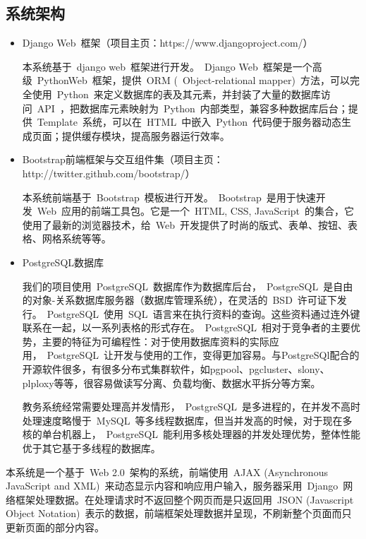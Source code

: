\subsection{系统架构}
\begin{itemize}
  \item Django Web~框架（项目主页：https://www.djangoproject.com/）
  
  \CJKindent 本系统基于~django web~框架进行开发。~Django Web~框架是一个高级~Python\footnotemark[1] Web~框架，提供~ORM (~Object-relational mapper)~方法，可以完全使用~Python~来定义数据库的表及其元素，并封装了大量的数据库访问~API~，把数据库元素映射为~Python~内部类型，兼容多种数据库后台；提供~Template~系统，可以在~HTML~中嵌入~Python~代码便于服务器动态生成页面；提供缓存模块，提高服务器运行效率。
  
  \item Bootstrap前端框架与交互组件集（项目主页：http://twitter.github.com/bootstrap/）
  
  \CJKindent 本系统前端基于~Bootstrap~模板进行开发。~Bootstrap~是用于快速开发~Web~应用的前端工具包。它是一个~HTML, CSS, JavaScript~的集合，它使用了最新的浏览器技术，给~Web~开发提供了时尚的版式、表单、按钮、表格、网格系统等等。
  
  \item PostgreSQL数据库
  
  \CJKindent 我们的项目使用~PostgreSQL~数据库作为数据库后台，~PostgreSQL~是自由的对象-关系数据库服务器（数据库管理系统），在灵活的~BSD~许可证下发行。~PostgreSQL~使用~SQL~语言来在执行资料的查询。这些资料通过连外键联系在一起，以一系列表格的形式存在。~PostgreSQL~相对于竞争者的主要优势，主要的特征为可编程性：对于使用数据库资料的实际应用，~PostgreSQL~让开发与使用的工作，变得更加容易。与PostgreSQl配合的开源软件很多，有很多分布式集群软件，如pgpool、pgcluster、slony、plploxy等等，很容易做读写分离、负载均衡、数据水平拆分等方案。
  
  \CJKindent 教务系统经常需要处理高并发情形，~PostgreSQL~是多进程的，在并发不高时处理速度略慢于~MySQL~等多线程数据库，但当并发高的时候，对于现在多核的单台机器上，~PostgreSQL~能利用多核处理器的并发处理优势，整体性能优于其它基于多线程的数据库。
\end{itemize}

本系统是一个基于~Web 2.0~架构的系统，前端使用~AJAX (Asynchronous JavaScript and XML)~来动态显示内容和响应用户输入，服务器采用~Django~网络框架处理数据。在处理请求时不返回整个网页而是只返回用~JSON (Javascript Object Notation)~表示的数据，前端框架处理数据并呈现，不刷新整个页面而只更新页面的部分内容。

